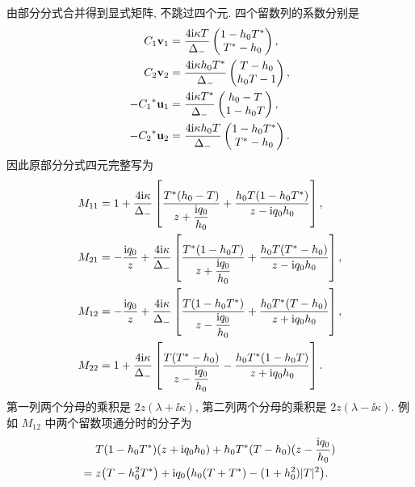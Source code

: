 \par\smallskip\noindent 由部分分式合并得到显式矩阵, 不跳过四个元.\quad
四个留数列的系数分别是
\begin{equation*}
\begin{aligned}
C_1\mathbf v_1
&=\dfrac{4\mathrm{i}\kappa T}{\Delta_-}
\begin{pmatrix}1-h_0{T}^{*}\\{T}^{*}-h_0\end{pmatrix},\\
C_2\mathbf v_2
&=\dfrac{4\mathrm{i}\kappa h_0{T}^{*}}{\Delta_-}
\begin{pmatrix}T-h_0\\h_0T-1\end{pmatrix},\\
-{C_1}^{*}\mathbf u_1
&=\dfrac{4\mathrm{i}\kappa{T}^{*}}{\Delta_-}
\begin{pmatrix}h_0-T\\1-h_0T\end{pmatrix},\\
-{C_2}^{*}\mathbf u_2
&=\dfrac{4\mathrm{i}\kappa h_0T}{\Delta_-}
\begin{pmatrix}1-h_0{T}^{*}\\{T}^{*}-h_0\end{pmatrix}.
\end{aligned}
\end{equation*}
因此原部分分式四元完整写为
\begin{equation*}
\begin{aligned}
M_{11}
&=1+\dfrac{4\mathrm{i}\kappa}{\Delta_-}
\left[
\dfrac{{T}^{*}(h_0-T)}{z+\dfrac{\mathrm{i} q_0}{h_0}}
+\dfrac{h_0T(1-h_0{T}^{*})}{z-\mathrm{i} q_0h_0}
\right],\\
M_{21}
&=-\dfrac{\mathrm{i} q_0}{z}
+\dfrac{4\mathrm{i}\kappa}{\Delta_-}
\left[
\dfrac{{T}^{*}(1-h_0T)}{z+\dfrac{\mathrm{i} q_0}{h_0}}
+\dfrac{h_0T({T}^{*}-h_0)}{z-\mathrm{i} q_0h_0}
\right],\\
M_{12}
&=-\dfrac{\mathrm{i} q_0}{z}
+\dfrac{4\mathrm{i}\kappa}{\Delta_-}
\left[
\dfrac{T(1-h_0{T}^{*})}{z-\dfrac{\mathrm{i} q_0}{h_0}}
+\dfrac{h_0{T}^{*}(T-h_0)}{z+\mathrm{i} q_0h_0}
\right],\\
M_{22}
&=1+\dfrac{4\mathrm{i}\kappa}{\Delta_-}
\left[
\dfrac{T({T}^{*}-h_0)}{z-\dfrac{\mathrm{i} q_0}{h_0}}
-\dfrac{h_0{T}^{*}(1-h_0T)}{z+\mathrm{i} q_0h_0}
\right].
\end{aligned}
\end{equation*}
第一列两个分母的乘积是 $2z(\lambda+\ii\kappa)$,
第二列两个分母的乘积是 $2z(\lambda-\ii\kappa)$.
例如 $M_{12}$ 中两个留数项通分时的分子为
\begin{equation*}
\begin{aligned}
&T(1-h_0{T}^{*})(z+\mathrm{i} q_0h_0)
+h_0{T}^{*}(T-h_0)(z-\dfrac{\mathrm{i} q_0}{h_0})\\
={}&z\bigl(T-h_0^2{T}^{*}\bigr)
+\mathrm{i} q_0\bigl(h_0(T+{T}^{*})-(1+h_0^2)|T|^2\bigr).
\end{aligned}
\end{equation*}

